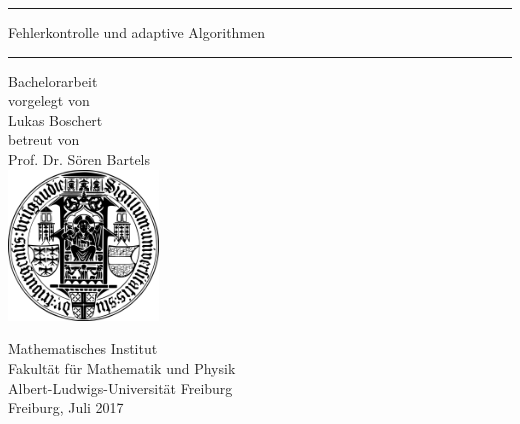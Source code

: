 \thispagestyle{empty}
\mbox{}
\begin{center}
\vspace*{2cm}
\hrule \vspace*{4mm}
{\huge \textsf{Fehlerkontrolle und adaptive Algorithmen}} \\[3mm]
\hrule \vspace*{3cm}
{\sc \huge Bachelorarbeit} \\[1cm]
vorgelegt von \\[.5cm]
{\Large Lukas Boschert} \\[1cm]
betreut von \\[.5cm]
{\Large Prof. Dr. S\"oren Bartels} \\[1.5cm]
\includegraphics[width=4cm]{pics/alu-wappen}

\bigskip

{\sc Mathematisches Institut} \\
{\sc Fakult\"at f\"ur Mathematik und Physik} \\
{\sc Albert-Ludwigs-Universit\"at Freiburg} \\[1cm]
{\Large Freiburg, Juli 2017}

\end{center}
\mbox{}

\newpage
\thispagestyle{empty}
\mbox{}

